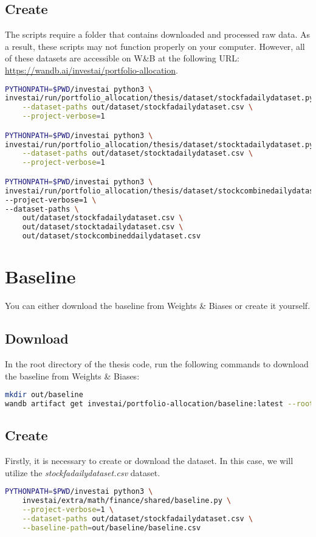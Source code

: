 \documentclass[../xlapes02]{subfiles}
\begin{document}
    \subsection{Create}
    The scripts require a folder that contains downloaded and processed raw data. As a result, these scripts may not function properly on your computer. However, all of these datasets are accessible on W\&B at the following URL: \url{https://wandb.ai/investai/portfolio-allocation}.
    \begin{lstlisting}[language=bash]
PYTHONPATH=$PWD/investai python3 \
investai/run/portfolio_allocation/thesis/dataset/stockfadailydataset.py \
    --dataset-paths out/dataset/stockfadailydataset.csv \
    --project-verbose=1

PYTHONPATH=$PWD/investai python3 \
investai/run/portfolio_allocation/thesis/dataset/stocktadailydataset.py \
    --dataset-paths out/dataset/stocktadailydataset.csv \
    --project-verbose=1

PYTHONPATH=$PWD/investai python3 \
investai/run/portfolio_allocation/thesis/dataset/stockcombinedailydataset.py \
--project-verbose=1 \
--dataset-paths \
    out/dataset/stockfadailydataset.csv \
    out/dataset/stocktadailydataset.csv \
    out/dataset/stockcombineddailydataset.csv
    \end{lstlisting}


    \section{Baseline}
    You can either download the baseline from Weights \& Biases or create it yourself.

    \subsection{Download}
    In the root directory of the thesis code, run the following commands to download the baseline from Weights \& Biases:
    \begin{lstlisting}[language=bash]
mkdir out/baseline
wandb artifact get investai/portfolio-allocation/baseline:latest --root out/baseline
    \end{lstlisting}

    \subsection{Create}
    Firstly, it is necessary to create or download the dataset. In this case, we will utilize the \emph{stockfadailydataset.csv} dataset.
    \begin{lstlisting}[language=bash]
PYTHONPATH=$PWD/investai python3 \
    investai/extra/math/finance/shared/baseline.py \
    --project-verbose=1 \
    --dataset-paths out/dataset/stockfadailydataset.csv \
    --baseline-path=out/baseline/baseline.csv
    \end{lstlisting}
\end{document}
